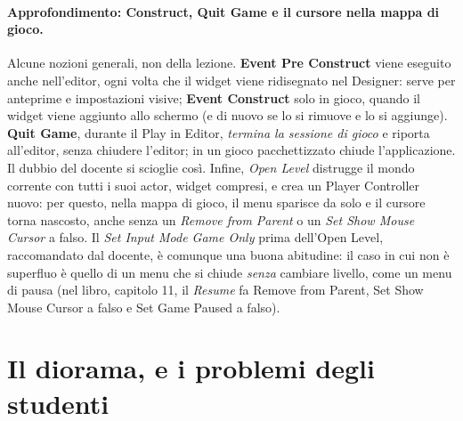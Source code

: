 \paragraph{Approfondimento: Construct, Quit Game e il cursore nella mappa di gioco.}
Alcune nozioni generali, non della lezione. \textbf{Event Pre Construct} viene eseguito
anche nell'editor, ogni volta che il widget viene ridisegnato nel Designer: serve per
anteprime e impostazioni visive; \textbf{Event Construct} solo in gioco, quando il widget
viene aggiunto allo schermo (e di nuovo se lo si rimuove e lo si aggiunge). \textbf{Quit
Game}, durante il Play in Editor, \emph{termina la sessione di gioco} e riporta
all'editor, senza chiudere l'editor; in un gioco pacchettizzato chiude l'applicazione. Il
dubbio del docente si scioglie così. Infine, \emph{Open Level} distrugge il mondo corrente
con tutti i suoi actor, widget compresi, e crea un Player Controller nuovo: per questo,
nella mappa di gioco, il menu sparisce da solo e il cursore torna nascosto, anche senza un
\emph{Remove from Parent} o un \emph{Set Show Mouse Cursor} a falso. Il \emph{Set Input
Mode Game Only} prima dell'Open Level, raccomandato dal docente, è comunque una buona
abitudine: il caso in cui non è superfluo è quello di un menu che si chiude \emph{senza}
cambiare livello, come un menu di pausa (nel libro, capitolo 11, il \emph{Resume} fa
Remove from Parent, Set Show Mouse Cursor a falso e Set Game Paused a falso).

\section{Il diorama, e i problemi degli studenti}
\label{ue12:sec:diorama}

